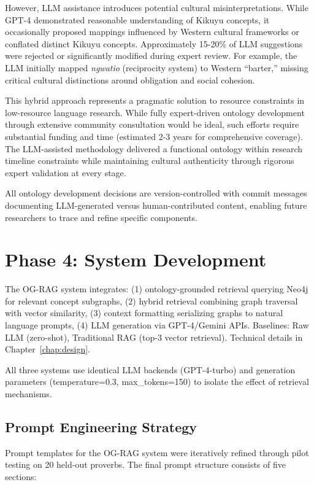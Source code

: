 However, LLM assistance introduces potential cultural misinterpretations. While GPT-4 demonstrated reasonable understanding of Kikuyu concepts, it occasionally proposed mappings influenced by Western cultural frameworks or conflated distinct Kikuyu concepts. Approximately 15-20\% of LLM suggestions were rejected or significantly modified during expert review. For example, the LLM initially mapped \emph{ngwatio} (reciprocity system) to Western ``barter,'' missing critical cultural distinctions around obligation and social cohesion.

This hybrid approach represents a pragmatic solution to resource constraints in low-resource language research. While fully expert-driven ontology development through extensive community consultation would be ideal, such efforts require substantial funding and time (estimated 2-3 years for comprehensive coverage). The LLM-assisted methodology delivered a functional ontology within research timeline constraints while maintaining cultural authenticity through rigorous expert validation at every stage.

All ontology development decisions are version-controlled with commit messages documenting LLM-generated versus human-contributed content, enabling future researchers to trace and refine specific components.

\section{Phase 4: System Development}
\label{sec:phase_modeling}

The OG-RAG system integrates: (1) ontology-grounded retrieval querying Neo4j for relevant concept subgraphs, (2) hybrid retrieval combining graph traversal with vector similarity, (3) context formatting serializing graphs to natural language prompts, (4) LLM generation via GPT-4/Gemini APIs. Baselines: Raw LLM (zero-shot), Traditional RAG (top-3 vector retrieval). Technical details in Chapter~\ref{chap:design}.

All three systems use identical LLM backends (GPT-4-turbo) and generation parameters (temperature=0.3, max\_tokens=150) to isolate the effect of retrieval mechanisms.

\subsection{Prompt Engineering Strategy}
\label{subsec:prompt_engineering}

Prompt templates for the OG-RAG system were iteratively refined through pilot testing on 20 held-out proverbs. The final prompt structure consists of five sections:

